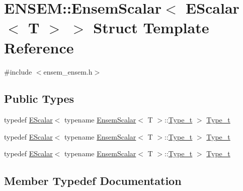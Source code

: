 \hypertarget{structENSEM_1_1EnsemScalar_3_01EScalar_3_01T_01_4_01_4}{}\section{E\+N\+S\+EM\+:\+:Ensem\+Scalar$<$ E\+Scalar$<$ T $>$ $>$ Struct Template Reference}
\label{structENSEM_1_1EnsemScalar_3_01EScalar_3_01T_01_4_01_4}


{\ttfamily \#include $<$ensem\+\_\+ensem.\+h$>$}

\subsection*{Public Types}
\begin{DoxyCompactItemize}
\item 
typedef \mbox{\hyperlink{classENSEM_1_1EScalar}{E\+Scalar}}$<$ typename \mbox{\hyperlink{structENSEM_1_1EnsemScalar}{Ensem\+Scalar}}$<$ T $>$\+::\mbox{\hyperlink{structENSEM_1_1EnsemScalar_3_01EScalar_3_01T_01_4_01_4_a1c2a1f5745c75b422ce4629dcc4d98c9}{Type\+\_\+t}} $>$ \mbox{\hyperlink{structENSEM_1_1EnsemScalar_3_01EScalar_3_01T_01_4_01_4_a1c2a1f5745c75b422ce4629dcc4d98c9}{Type\+\_\+t}}
\item 
typedef \mbox{\hyperlink{classENSEM_1_1EScalar}{E\+Scalar}}$<$ typename \mbox{\hyperlink{structENSEM_1_1EnsemScalar}{Ensem\+Scalar}}$<$ T $>$\+::\mbox{\hyperlink{structENSEM_1_1EnsemScalar_3_01EScalar_3_01T_01_4_01_4_a1c2a1f5745c75b422ce4629dcc4d98c9}{Type\+\_\+t}} $>$ \mbox{\hyperlink{structENSEM_1_1EnsemScalar_3_01EScalar_3_01T_01_4_01_4_a1c2a1f5745c75b422ce4629dcc4d98c9}{Type\+\_\+t}}
\item 
typedef \mbox{\hyperlink{classENSEM_1_1EScalar}{E\+Scalar}}$<$ typename \mbox{\hyperlink{structENSEM_1_1EnsemScalar}{Ensem\+Scalar}}$<$ T $>$\+::\mbox{\hyperlink{structENSEM_1_1EnsemScalar_3_01EScalar_3_01T_01_4_01_4_a1c2a1f5745c75b422ce4629dcc4d98c9}{Type\+\_\+t}} $>$ \mbox{\hyperlink{structENSEM_1_1EnsemScalar_3_01EScalar_3_01T_01_4_01_4_a1c2a1f5745c75b422ce4629dcc4d98c9}{Type\+\_\+t}}
\end{DoxyCompactItemize}


\subsection{Member Typedef Documentation}
\mbox{\label{structENSEM_1_1EnsemScalar_3_01EScalar_3_01T_01_4_01_4_a1c2a1f5745c75b422ce4629dcc4d98c9}} 
